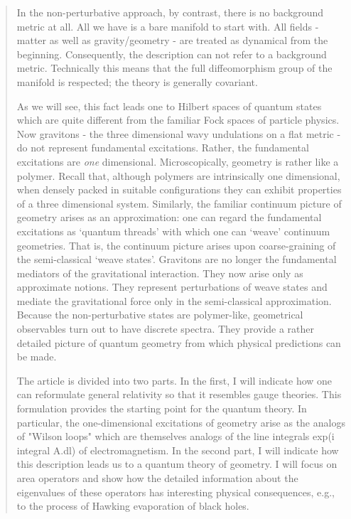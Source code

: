 \begin{quote}
In the non-perturbative approach, by contrast, there is no background
metric at all.  All we have is a bare manifold to start with.  All
fields - matter as well as gravity/geometry - are treated as dynamical
from the beginning. Consequently, the description can not refer to a
background metric.  Technically this means that the full diffeomorphism
group of the manifold is respected; the theory is generally covariant.

As we will see, this fact leads one to Hilbert spaces of quantum states
which are quite different from the familiar Fock spaces of particle
physics.  Now gravitons - the three dimensional wavy undulations on a
flat metric - do not represent fundamental excitations. Rather, the
fundamental excitations are \emph{one} dimensional.  Microscopically, geometry
is rather like a polymer.  Recall that, although polymers are
intrinsically one dimensional, when densely packed in suitable
configurations they can exhibit properties of a three dimensional
system.  Similarly, the familiar continuum picture of geometry arises as
an approximation: one can regard the fundamental excitations as `quantum
threads' with which one can `weave' continuum geometries.  That is, the
continuum picture arises upon coarse-graining of the semi-classical
`weave states'.  Gravitons are no longer the fundamental mediators of the
gravitational interaction.  They now arise only as approximate notions. 
They represent perturbations of weave states and mediate the
gravitational force only in the semi-classical approximation.  Because
the non-perturbative states are polymer-like, geometrical observables
turn out to have discrete spectra.  They provide a rather detailed
picture of quantum geometry from which physical predictions can be made.

The article is divided into two parts.  In the first, I will indicate
how one can reformulate general relativity so that it resembles gauge
theories.  This formulation provides the starting point for the quantum
theory.  In particular, the one-dimensional excitations of geometry
arise as the analogs of "Wilson loops" which are 
themselves analogs of
the line integrals exp(i integral A.dl) of electromagnetism.  In the
second part, I will indicate how this description leads us to a quantum
theory of geometry.  I will focus on area operators and show how the
detailed information about the eigenvalues of these operators has
interesting physical consequences, e.g., to the process of Hawking
evaporation of black holes.
\end{quote}

